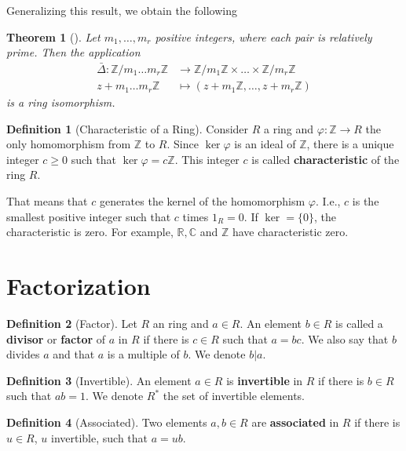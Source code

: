 \documentclass[12pt,a4paper]{article}
\newtheorem{theorem}{Theorem}[section]
\theoremstyle{definition}
\newtheorem{definition}{Definition}[section]
\begin{document}
Generalizing this result, we obtain the following 
\begin{theorem}[]
Let $m_1, \ldots, m_r$ positive integers, where each pair is relatively prime. Then the application
\begin{equation*}
\begin{aligned}
\bar{\Delta} : \mathbb{Z}/m_1\ldots m_r \mathbb{Z} & \to \mathbb{Z}/m_1\mathbb{Z} \times \ldots \times \mathbb{Z}/m_r \mathbb{Z} \\
z+m_1\ldots m_r \mathbb{Z} & \mapsto (z+m_1\mathbb{Z}, \ldots, z+m_r\mathbb{Z})
\end{aligned}
\end{equation*}
is a ring isomorphism.
\end{theorem}

\begin{definition}[Characteristic of a Ring]
Consider $R$ a ring and $\varphi: \mathbb{Z} \to R$ the only homomorphism from $\mathbb{Z}$ to $R$. Since $\ker \varphi$ is an ideal of $\mathbb{Z}$, there is a unique integer $c \geq 0$ such that $\ker \varphi = c \mathbb{Z}$. This integer $c$ is called \textbf{characteristic} of the ring $R$.
\end{definition}

That means that $c$ generates the kernel of the homomorphism $\varphi$. I.e., $c$ is the smallest positive integer such that $c$ times $1_R = 0$. If $\ker = \{ 0 \}$, the characteristic is zero. For example, $\mathbb{R}, \mathbb{C}$ and $\mathbb{Z}$ have characteristic zero.

\section{Factorization}

\begin{definition}[Factor]
Let $R$ an ring and $a \in R$. An element $b \in R$ is called a \textbf{divisor} or \textbf{factor} of $a$ in $R$ if there is $c \in R$ such that $a=bc$. We also say that $b$ divides $a$ and that $a$ is a multiple of $b$. We denote $b | a$.
\end{definition}

\begin{definition}[Invertible]
An element $a \in R$ is \textbf{invertible} in $R$ if there is $b \in R$ such that $ab = 1$. We denote $R^{\ast}$ the set of invertible elements.
\end{definition}

\begin{definition}[Associated]
Two elements $a,b \in R$ are \textbf{associated} in $R$ if there is $u \in R$, $u$ invertible, such that $a = ub$.
\end{definition}
\end{document}

